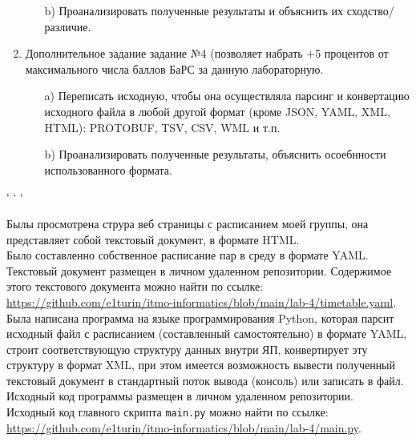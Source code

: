 \begin{enumerate}
\begin{itemize}
        \item[b)] Проанализировать полученные результаты и объяснить их  сходство/различие.
    \end{itemize}
\item Дополнительное задание задание №4 (позволяет набрать +5 процентов  от максимального числа баллов БаРС за данную лабораторную.
    \begin{itemize}
        \item[a)] Переписать исходную, чтобы она осуществляла парсинг и  конвертацию исходного файла в любой другой формат (кроме  JSON, YAML, XML, HTML): PROTOBUF, TSV, CSV, WML и  т.п.
        \item[b)] Проанализировать полученные результаты, объяснить  осоебнности использованного формата.
    \end{itemize}
\end{enumerate}
\begin{center}
    {` ` `}
\end{center}  


\newpage
{}
Былы просмотрена струра веб страницы с расписанием моей группы, она представляет собой текстовый документ, в формате HTML.\\
Было составленно собственное расписание пар в среду в формате YAML.
Текстовый документ размещен в личном удаленном репозитории.  Содержимое этого текстового документа можно найти по ссылке: \url{https://github.com/e1turin/itmo-informatics/blob/main/lab-4/timetable.yaml}.\\


Была написана программа на языке программирования Python, которая парсит исходный файл с расписанием (составленный самостоятельно) в формате YAML, строит соответствующую структуру данных внутри ЯП, конвертирует эту структуру в формат XML, при этом имеется возможность вывести полученный текстовый документ в стандартный поток вывода (консоль) или записать в файл.\\
Исходный код программы размещен в личном удаленном репозитории. \\
Исходный код главного скрипта \texttt{main.py} можно найти по ссылке:\\ \url{https://github.com/e1turin/itmo-informatics/blob/main/lab-4/main.py}.\\


